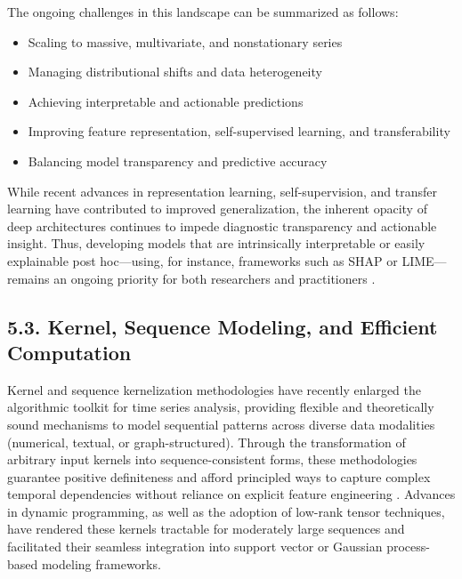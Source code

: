 \documentclass[11pt]{article}
\begin{document}
The ongoing challenges in this landscape can be summarized as follows:

\begin{itemize}
    \item Scaling to massive, multivariate, and nonstationary series
    \item Managing distributional shifts and data heterogeneity
    \item Achieving interpretable and actionable predictions
    \item Improving feature representation, self-supervised learning, and transferability
    \item Balancing model transparency and predictive accuracy
\end{itemize}

While recent advances in representation learning, self-supervision, and transfer learning have contributed to improved generalization, the inherent opacity of deep architectures continues to impede diagnostic transparency and actionable insight. Thus, developing models that are intrinsically interpretable or easily explainable post hoc—using, for instance, frameworks such as SHAP or LIME—remains an ongoing priority for both researchers and practitioners \cite{ref82}.

\subsection{5.3. Kernel, Sequence Modeling, and Efficient Computation}

Kernel and sequence kernelization methodologies have recently enlarged the algorithmic toolkit for time series analysis, providing flexible and theoretically sound mechanisms to model sequential patterns across diverse data modalities (numerical, textual, or graph-structured). Through the transformation of arbitrary input kernels into sequence-consistent forms, these methodologies guarantee positive definiteness and afford principled ways to capture complex temporal dependencies without reliance on explicit feature engineering \cite{ref80}. Advances in dynamic programming, as well as the adoption of low-rank tensor techniques, have rendered these kernels tractable for moderately large sequences and facilitated their seamless integration into support vector or Gaussian process-based modeling frameworks.
\end{document}
